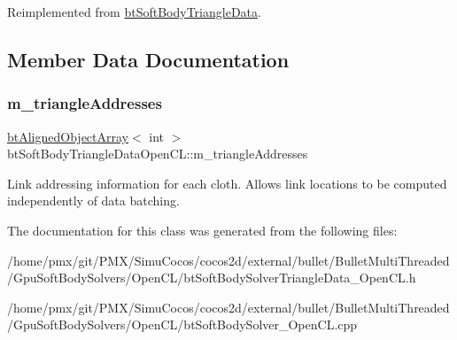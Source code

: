 Reimplemented from \hyperlink{classbtSoftBodyTriangleData}{bt\+Soft\+Body\+Triangle\+Data}.



\subsection{Member Data Documentation}
\mbox{\label{classbtSoftBodyTriangleDataOpenCL_a7b0d241380b3cbfbd7c386b354a268fd}} 
\subsubsection{\texorpdfstring{m\+\_\+triangle\+Addresses}{m\_triangleAddresses}}
{\footnotesize\ttfamily \hyperlink{classbtAlignedObjectArray}{bt\+Aligned\+Object\+Array}$<$ int $>$ bt\+Soft\+Body\+Triangle\+Data\+Open\+C\+L\+::m\+\_\+triangle\+Addresses}

Link addressing information for each cloth. Allows link locations to be computed independently of data batching. 

The documentation for this class was generated from the following files\+:\begin{DoxyCompactItemize}
\item 
/home/pmx/git/\+P\+M\+X/\+Simu\+Cocos/cocos2d/external/bullet/\+Bullet\+Multi\+Threaded/\+Gpu\+Soft\+Body\+Solvers/\+Open\+C\+L/bt\+Soft\+Body\+Solver\+Triangle\+Data\+\_\+\+Open\+C\+L.\+h\item 
/home/pmx/git/\+P\+M\+X/\+Simu\+Cocos/cocos2d/external/bullet/\+Bullet\+Multi\+Threaded/\+Gpu\+Soft\+Body\+Solvers/\+Open\+C\+L/bt\+Soft\+Body\+Solver\+\_\+\+Open\+C\+L.\+cpp\end{DoxyCompactItemize}
